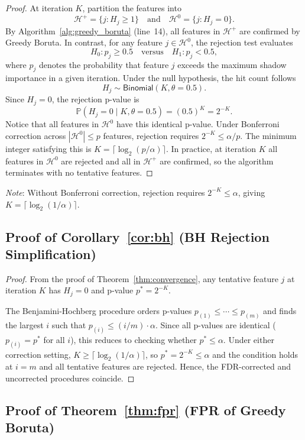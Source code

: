 \documentclass[runningheads]{llncs}
\begin{document}
\begin{proof}
At iteration $K$, partition the features into
$$
\mathcal{H}^{+} = \{j : H_j \geq 1\}
\quad\text{and}\quad
\mathcal{H}^{0} = \{j : H_j = 0\}.
$$
By Algorithm~\ref{alg:greedy_boruta} (line~14), all features in $\mathcal{H}^{+}$ are confirmed by Greedy Boruta. In contrast, for any feature $j \in \mathcal{H}^{0}$, the rejection test evaluates
$$
H_0 : p_j \geq 0.5
\quad \text{versus} \quad
H_1 : p_j < 0.5,
$$
where $p_j$ denotes the probability that feature $j$ exceeds the maximum shadow importance in a given iteration. Under the null hypothesis, the hit count follows
$$
H_j \sim \mathsf{Binomial}(K,\theta=0.5).
$$
Since $H_j = 0$, the rejection p-value is
$$
\mathbb{P}(H_j = 0 \mid K,\theta=0.5)
=
(0.5)^K
=
2^{-K}.
$$
Notice that all features in $\mathcal{H}^0$ have this identical p-value. Under Bonferroni correction across $|\mathcal{H}^0| \leq p$ features, rejection requires $2^{-K} \leq \alpha/p$. The minimum integer satisfying this is $K = \lceil \log_2(p/\alpha) \rceil$. In practice, at iteration $K$ all features in $\mathcal{H}^0$ are rejected and all in $\mathcal{H}^+$ are confirmed, so the algorithm terminates with no tentative features.
\end{proof}
\noindent
\textit{Note}: Without Bonferroni correction, rejection requires $2^{-K} \leq \alpha$, giving $K = \lceil \log_2(1/\alpha) \rceil$. 

\subsection{Proof of Corollary~\ref{cor:bh} (BH Rejection Simplification)}

\begin{proof}
From the proof of Theorem~\ref{thm:convergence}, any tentative feature $j$ at iteration $K$ has $H_j = 0$ and p-value $p^* = 2^{-K}$.

The Benjamini-Hochberg procedure orders p-values $p_{(1)} \leq \cdots \leq p_{(m)}$ and finds the largest $i$ such that $p_{(i)} \leq (i/m) \cdot \alpha$. Since all p-values are identical ($p_{(i)} = p^*$ for all $i$), this reduces to checking whether $p^* \leq \alpha$. Under either correction setting, $K \geq \lceil \log_2(1/\alpha) \rceil$, so $p^* = 2^{-K} \leq \alpha$ and the condition holds at $i = m$ and all tentative features are rejected. Hence, the FDR-corrected and uncorrected procedures coincide.
\end{proof}

\subsection{Proof of Theorem~\ref{thm:fpr} (FPR of Greedy Boruta)}
\end{document}

